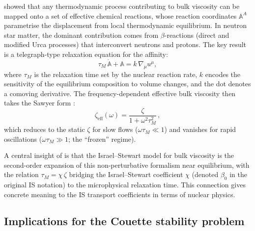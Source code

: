 \citet{GavassinoBulkViscosity2020} showed that any thermodynamic process
contributing to bulk viscosity can be mapped onto a set of effective
chemical reactions, whose reaction coordinates $\mathbb{A}^{A}$ parametrise
the displacement from local thermodynamic equilibrium.  In neutron star
matter, the dominant contribution comes from $\beta$-reactions
(direct and modified Urca processes) that interconvert neutrons and protons.
The key result is a telegraph-type relaxation equation for the affinity:
\begin{equation}
\label{eq:rel-7-telegraph}
\tau_{M}\,\dot{\mathbb{A}} + \mathbb{A}
= k\,\nabla_{\mu}u^{\mu},
\end{equation}
where $\tau_{M}$ is the relaxation time set by the nuclear reaction rate,
$k$ encodes the sensitivity of the equilibrium composition to volume changes,
and the dot denotes a comoving derivative.  The frequency-dependent effective
bulk viscosity then takes the Sawyer form
\citep{GavassinoBulkViscosity2020}:
\begin{equation}
\label{eq:rel-7-zeta-eff}
\zeta_{\mathrm{eff}}(\omega) = \frac{\zeta}{1+\omega^{2}\tau_{M}^{2}}\,,
\end{equation}
which reduces to the static $\zeta$ for slow flows ($\omega\tau_{M}\ll 1$)
and vanishes for rapid oscillations ($\omega\tau_{M}\gg 1$; the ``frozen''
regime).

A central insight of \citet{GavassinoBulkViscosity2020} is that the
Israel--Stewart model for bulk viscosity is the second-order expansion
of this non-perturbative formalism near equilibrium, with the relation
$\tau_{M}=\chi\,\zeta$ bridging the Israel--Stewart coefficient $\chi$
(denoted $\beta_{0}$ in the original IS notation) to the microphysical
relaxation time.  This connection gives concrete meaning to the IS
transport coefficients in terms of nuclear physics.

\subsection{Implications for the Couette stability problem}
\label{sec:rel-7-bulk-couette}

